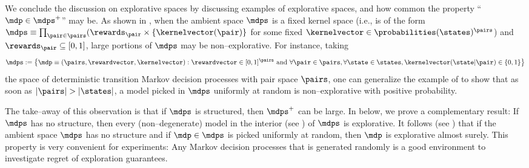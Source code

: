 \documentclass[preprint,cleveref,12pt]{colt2025}
\DeclarePairedDelimiter{\braces}{\{}{\}}	%
\DeclarePairedDelimiter{\abs}{\lvert}{\rvert}	%
\def\product{\prod}
\def\model{\mdp}
\def\models{\mdps}
\def\kernel{\kernelvector}
\def\reward{\rewardvector}
\begin{document}
    We conclude the discussion on explorative spaces by discussing examples of explorative spaces, and how common the property ``$\model \in \models^+$'' may be. 
    As shown in , when the ambient space $\models$ is a fixed kernel space (i.e., is of the form $\models \equiv \product_{\pair \in \pairs} (\rewards_\pair \times \braces{\kernel(\pair)}$ for some fixed $\kernel \in \probabilities(\states)^\pairs$) and $\rewards_\pair \subseteq [0,1]$, large portions of $\models$ may be non--explorative. 
    For instance, taking 
    \begin{equation*}
        \models := \braces*{
            \model \equiv (\pairs, \reward, \kernel)
            :
            \reward \in [0, 1]^\pairs
            \text{~and~}
            \forall \pair \in \pairs,
            \forall \state \in \states,
            \kernel(\state|\pair) \in \braces{0, 1}
        }
    \end{equation*}
    the space of deterministic transition Markov decision processes with pair space $\pairs$, one can generalize the example of  to show that as soon as $\abs{\pairs} > \abs{\states}$, a model picked in $\models$ uniformly at random is non--explorative with positive probability.  

    The take--away of this observation is that if $\models$ is structured, then $\models^+$ can be large. 
    In  below, we prove a complementary result: If $\models$ has no structure, then every (non--degenerate) model in the interior (see ) of $\models$ is explorative. 
    It follows (see ) that if the ambient space $\models$ has no structure and if $\model \in \models$ is picked uniformly at random, then $\model$ is explorative almost surely. 
    This property is very convenient for experiments: Any Markov decision processes that is generated randomly is a good environment to investigate regret of exploration guarantees. 
\end{document}
